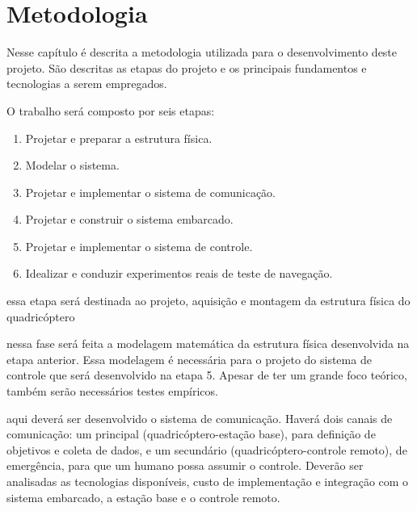 \chapter{Metodologia} \label{cap:metod}

Nesse capítulo é descrita a metodologia utilizada para o desenvolvimento deste projeto. São descritas as etapas do projeto e os principais fundamentos e tecnologias a serem empregados.

O trabalho será composto por seis etapas:

\begin{enumerate}
\item Projetar e preparar a estrutura física.
\item Modelar o sistema.
\item Projetar e implementar o sistema de comunicação.
\item Projetar e construir o sistema embarcado.
\item Projetar e implementar o sistema de controle.
\item Idealizar e conduzir experimentos reais de teste de navegação.
\end{enumerate}

 essa etapa será destinada ao projeto, aquisição e montagem da estrutura física do quadricóptero %

 nessa fase será feita a modelagem matemática da estrutura física desenvolvida na etapa anterior. Essa modelagem é necessária para o projeto do sistema de controle que será desenvolvido na etapa 5. Apesar de ter um grande foco teórico, também serão necessários testes empíricos.

 aqui deverá ser desenvolvido o sistema de comunicação. Haverá dois canais de comunicação: um principal (quadricóptero-estação base), para definição de objetivos e coleta de dados, e um secundário (quadricóptero-controle remoto), de emergência, para que um humano possa assumir o controle. Deverão ser analisadas as tecnologias disponíveis, custo de implementação e integração com o sistema embarcado, a estação base e o controle remoto.


